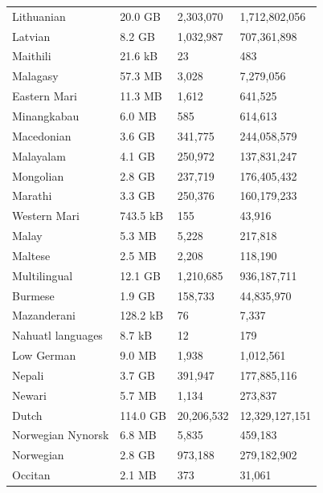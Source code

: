 \begin{table}[t!]
\begin{tabular}{llll}
        Lithuanian        & 20.0 GB   & 2,303,070  & 1,712,802,056  \\
        Latvian           & 8.2 GB    & 1,032,987  & 707,361,898    \\
        Maithili          & 21.6 kB   & 23         & 483            \\
        Malagasy          & 57.3 MB   & 3,028      & 7,279,056      \\
        Eastern Mari      & 11.3 MB   & 1,612      & 641,525        \\
        Minangkabau       & 6.0 MB    & 585        & 614,613        \\
        Macedonian        & 3.6 GB    & 341,775    & 244,058,579    \\
        Malayalam         & 4.1 GB    & 250,972    & 137,831,247    \\
        Mongolian         & 2.8 GB    & 237,719    & 176,405,432    \\
        Marathi           & 3.3 GB    & 250,376    & 160,179,233    \\
        Western Mari      & 743.5 kB  & 155        & 43,916         \\
        Malay             & 5.3 MB    & 5,228      & 217,818        \\
        Maltese           & 2.5 MB    & 2,208      & 118,190        \\
        Multilingual      & 12.1 GB   & 1,210,685  & 936,187,711    \\
        Burmese           & 1.9 GB    & 158,733    & 44,835,970     \\
        Mazanderani       & 128.2 kB  & 76         & 7,337          \\
        Nahuatl languages & 8.7 kB    & 12         & 179            \\
        Low German        & 9.0 MB    & 1,938      & 1,012,561      \\
        Nepali            & 3.7 GB    & 391,947    & 177,885,116    \\
        Newari            & 5.7 MB    & 1,134      & 273,837        \\
        Dutch             & 114.0 GB  & 20,206,532 & 12,329,127,151 \\
        Norwegian Nynorsk & 6.8 MB    & 5,835      & 459,183        \\
        Norwegian         & 2.8 GB    & 973,188    & 279,182,902    \\
        Occitan           & 2.1 MB    & 373        & 31,061         \\

\end{tabular}
\end{table}
